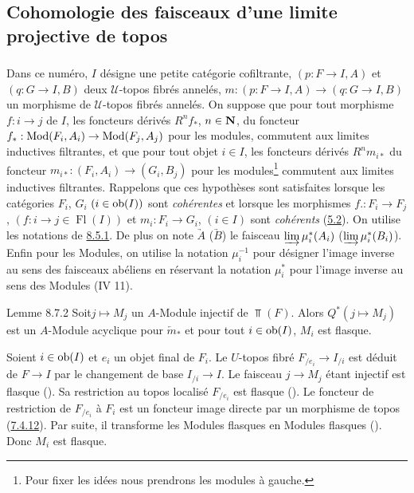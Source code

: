 \documentclass[10pt]{../fichiers-configuration-latex/smfart}
\begin{document}
\subsection{Cohomologie des faisceaux d'une limite projective de
  topos}

\subsubsection{}

Dans ce numéro, $I$ désigne une petite catégorie cofiltrante, $(p : F
\to I, A)$ et $(q : G \to I, B)$ deux $𝒰$-topos fibrés annelés, $m :
(p : F \to I, A) \to (q : G \to I, B)$ un morphisme de $𝒰$-topos
fibrés annelés. On suppose que pour tout morphisme $f : i \to j$ de
$I$, les foncteurs dérivés $R^n f_{\ast}$, $n \in \mathbf{N}$, du
foncteur $f_{\ast} : \Mod(F_i, A_i)\to \Mod(F_j, A_j)$ pour les modules,
commutent aux limites inductives filtrantes, et que pour tout objet $i
\in I$, les foncteurs dérivés $R^{n} m_{i\ast}$ du foncteur
$m_{i\ast} : (F_i, A_i) \to (G_i, B_j)$ pour les modules\footnote{Pour
fixer les idées nous prendrons les modules à gauche.} commutent aux
limites inductives filtrantes. Rappelons que ces hypothèses sont
satisfaites lorsque les catégories $F_i$, $G_i$ $(i \in \operatorname{ob} (I))$ sont
\emph{cohérentes} et lorsque les morphismes $f. : F_i \to F_j$, $(f :
i \to j \in \operatorname{Fl}(I))$ et $m_i : F_i \to G_i$, $(i \in I)$ sont
\emph{cohérents} (\hyperref[VI.cor5.2]{5.2}). On utilise les notations de \hyperref[VI.subsubsec8.5.1]{8.5.1}. De plus on
note $\underrightarrow{A}$ (\resp $\underrightarrow{B}$) le faisceau
$\varinjlim\mu^{\ast}_i (A_i)$ (\resp $\varinjlim\mu^{\ast}_i
(B_i)$). Enfin pour les Modules, on utilise la notation $\mu^{-1}_i$
pour désigner l'image inverse au sens des faisceaux abéliens en
réservant la notation $\mu_i^{\ast}$ pour l'image inverse au sens des
Modules (IV 11).

\begin{enonce*}{Lemme 8.7.2}
Soit\pageoriginale $j \mapsto M_j$ un $A$-Module injectif de $\Top(F)$. Alors
$Q^{\ast} (j \mapsto M_j)$ est un $A$-Module acyclique pour
$\underleftarrow{m}_{\ast}$ et pour tout $i \in \operatorname{ob}(I)$, $M_i$ est flasque.
\end{enonce*}

Soient $i \in \operatorname{ob} (I)$ et $e_i$ un objet final de $F_i$. Le
$U$-topos fibré $F_{/e_{i}} \to I_{/i}$ est déduit de $F \to I$ par
le changement de base $I_{/i} \to I$. Le faisceau $j \to M_j$ étant
injectif est flasque (). Sa restriction au topos
localisé $F_{/e_i}$ est flasque (). Le foncteur de
restriction de $F_{/e_i}$ à $F_i$ est un foncteur image directe par
un morphisme de topos (\hyperref[VI.lem7.4.12]{7.4.12}). Par suite, il transforme
les Modules flasques en Modules flasques (). Donc
$M_i$ est flasque.
\end{document}
